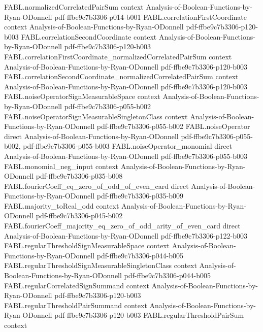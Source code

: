 \begin{theorem}
\proofstep
  {FABL.normalizedCorrelatedPairSum}
  {context}
  {Analysis-of-Boolean-Functions-by-Ryan-ODonnell}
  {pdf-ffbe9c7b3306-p014-b001}
\proofstep
  {FABL.correlationFirstCoordinate}
  {context}
  {Analysis-of-Boolean-Functions-by-Ryan-ODonnell}
  {pdf-ffbe9c7b3306-p120-b003}
\proofstep
  {FABL.correlationSecondCoordinate}
  {context}
  {Analysis-of-Boolean-Functions-by-Ryan-ODonnell}
  {pdf-ffbe9c7b3306-p120-b003}
\proofstep
  {FABL.correlationFirstCoordinate_normalizedCorrelatedPairSum}
  {context}
  {Analysis-of-Boolean-Functions-by-Ryan-ODonnell}
  {pdf-ffbe9c7b3306-p120-b003}
\proofstep
  {FABL.correlationSecondCoordinate_normalizedCorrelatedPairSum}
  {context}
  {Analysis-of-Boolean-Functions-by-Ryan-ODonnell}
  {pdf-ffbe9c7b3306-p120-b003}
\proofstep
  {FABL.noiseOperatorSignMeasurableSpace}
  {context}
  {Analysis-of-Boolean-Functions-by-Ryan-ODonnell}
  {pdf-ffbe9c7b3306-p055-b002}
\proofstep
  {FABL.noiseOperatorSignMeasurableSingletonClass}
  {context}
  {Analysis-of-Boolean-Functions-by-Ryan-ODonnell}
  {pdf-ffbe9c7b3306-p055-b002}
\proofstep
  {FABL.noiseOperator}
  {direct}
  {Analysis-of-Boolean-Functions-by-Ryan-ODonnell}
  {pdf-ffbe9c7b3306-p055-b002,
    pdf-ffbe9c7b3306-p055-b003}
\proofstep
  {FABL.noiseOperator_monomial}
  {direct}
  {Analysis-of-Boolean-Functions-by-Ryan-ODonnell}
  {pdf-ffbe9c7b3306-p055-b003}
\proofstep
  {FABL.monomial_neg_input}
  {context}
  {Analysis-of-Boolean-Functions-by-Ryan-ODonnell}
  {pdf-ffbe9c7b3306-p035-b008}
\proofstep
  {FABL.fourierCoeff_eq_zero_of_odd_of_even_card}
  {direct}
  {Analysis-of-Boolean-Functions-by-Ryan-ODonnell}
  {pdf-ffbe9c7b3306-p035-b009}
\proofstep
  {FABL.majority_toReal_odd}
  {context}
  {Analysis-of-Boolean-Functions-by-Ryan-ODonnell}
  {pdf-ffbe9c7b3306-p045-b002}
\proofstep
  {FABL.fourierCoeff_majority_eq_zero_of_odd_arity_of_even_card}
  {direct}
  {Analysis-of-Boolean-Functions-by-Ryan-ODonnell}
  {pdf-ffbe9c7b3306-p122-b003}
\proofstep
  {FABL.regularThresholdSignMeasurableSpace}
  {context}
  {Analysis-of-Boolean-Functions-by-Ryan-ODonnell}
  {pdf-ffbe9c7b3306-p044-b005}
\proofstep
  {FABL.regularThresholdSignMeasurableSingletonClass}
  {context}
  {Analysis-of-Boolean-Functions-by-Ryan-ODonnell}
  {pdf-ffbe9c7b3306-p044-b005}
\proofstep
  {FABL.regularCorrelatedSignSummand}
  {context}
  {Analysis-of-Boolean-Functions-by-Ryan-ODonnell}
  {pdf-ffbe9c7b3306-p120-b003}
\proofstep
  {FABL.regularThresholdPairSummand}
  {context}
  {Analysis-of-Boolean-Functions-by-Ryan-ODonnell}
  {pdf-ffbe9c7b3306-p120-b003}
\proofstep
  {FABL.regularThresholdPairSum}
  {context}

\end{theorem}
